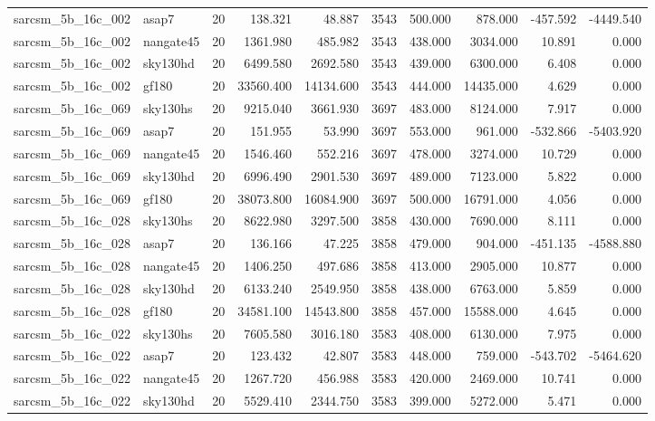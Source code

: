 \begin{longtable}{llrrrrrrrr}
sarcsm\_5b\_16c\_002 & asap7 & 20 & 138.321 & 48.887 & 3543 & 500.000 & 878.000 & -457.592 & -4449.540 \\
sarcsm\_5b\_16c\_002 & nangate45 & 20 & 1361.980 & 485.982 & 3543 & 438.000 & 3034.000 & 10.891 & 0.000 \\
sarcsm\_5b\_16c\_002 & sky130hd & 20 & 6499.580 & 2692.580 & 3543 & 439.000 & 6300.000 & 6.408 & 0.000 \\
sarcsm\_5b\_16c\_002 & gf180 & 20 & 33560.400 & 14134.600 & 3543 & 444.000 & 14435.000 & 4.629 & 0.000 \\
sarcsm\_5b\_16c\_069 & sky130hs & 20 & 9215.040 & 3661.930 & 3697 & 483.000 & 8124.000 & 7.917 & 0.000 \\
sarcsm\_5b\_16c\_069 & asap7 & 20 & 151.955 & 53.990 & 3697 & 553.000 & 961.000 & -532.866 & -5403.920 \\
sarcsm\_5b\_16c\_069 & nangate45 & 20 & 1546.460 & 552.216 & 3697 & 478.000 & 3274.000 & 10.729 & 0.000 \\
sarcsm\_5b\_16c\_069 & sky130hd & 20 & 6996.490 & 2901.530 & 3697 & 489.000 & 7123.000 & 5.822 & 0.000 \\
sarcsm\_5b\_16c\_069 & gf180 & 20 & 38073.800 & 16084.900 & 3697 & 500.000 & 16791.000 & 4.056 & 0.000 \\
sarcsm\_5b\_16c\_028 & sky130hs & 20 & 8622.980 & 3297.500 & 3858 & 430.000 & 7690.000 & 8.111 & 0.000 \\
sarcsm\_5b\_16c\_028 & asap7 & 20 & 136.166 & 47.225 & 3858 & 479.000 & 904.000 & -451.135 & -4588.880 \\
sarcsm\_5b\_16c\_028 & nangate45 & 20 & 1406.250 & 497.686 & 3858 & 413.000 & 2905.000 & 10.877 & 0.000 \\
sarcsm\_5b\_16c\_028 & sky130hd & 20 & 6133.240 & 2549.950 & 3858 & 438.000 & 6763.000 & 5.859 & 0.000 \\
sarcsm\_5b\_16c\_028 & gf180 & 20 & 34581.100 & 14543.800 & 3858 & 457.000 & 15588.000 & 4.645 & 0.000 \\
sarcsm\_5b\_16c\_022 & sky130hs & 20 & 7605.580 & 3016.180 & 3583 & 408.000 & 6130.000 & 7.975 & 0.000 \\
sarcsm\_5b\_16c\_022 & asap7 & 20 & 123.432 & 42.807 & 3583 & 448.000 & 759.000 & -543.702 & -5464.620 \\
sarcsm\_5b\_16c\_022 & nangate45 & 20 & 1267.720 & 456.988 & 3583 & 420.000 & 2469.000 & 10.741 & 0.000 \\
sarcsm\_5b\_16c\_022 & sky130hd & 20 & 5529.410 & 2344.750 & 3583 & 399.000 & 5272.000 & 5.471 & 0.000 \\

\end{longtable}
